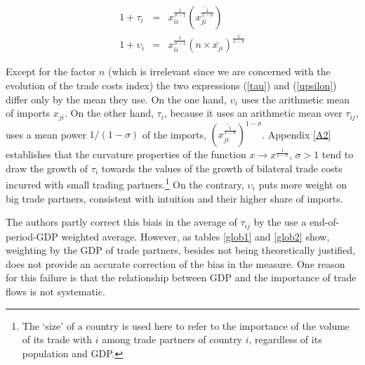 \documentclass{article}
\begin{document}
\begin{eqnarray}
1+\tau_i&=& x_{ii}^{\frac{1}{\sigma-1}} \left(\overline{{x_{ji}^{\frac{1}{1-\sigma}}}}\right) \label{tau}\\
1+\upsilon_i&=&x_{ii}^{\frac{1}{\sigma-1}} (n \times \overline{x_{ji}})^{\frac{1}{1-\sigma}}\label{upsilon}
\end{eqnarray}

Except for the factor $n$ (which is irrelevant since we are
concerned with the evolution of the trade costs index) the two
expressions (\ref{tau}) and (\ref{upsilon}) differ only by the
mean they use. On the one hand, $\upsilon_i$ uses the
arithmetic mean of imports $x_{ji}$. On the other hand,
$\tau_i$, because it uses an arithmetic mean over $\tau_{ij}$,
uses a mean power $1/(1-\sigma)$ of the imports,
$\left(\overline{x_{ji}^{\frac{1}{1-\sigma}}}\right)^{1-\sigma}$.
Appendix \ref{A2} establishes that the curvature
properties of the function $x \rightarrow
x^{\frac{1}{1-\sigma}}$, $\sigma>1$ tend to draw the growth of
$\tau_i$ towards the values of the growth of bilateral trade
costs incurred with small trading partners.\footnote{The `size' of a country is
used here to refer to the importance of the volume of its trade
with $i$ among trade partners of country $i$, regardless of its
population and GDP.} On the contrary,
$\upsilon_i$ puts more weight on big trade partners, consistent
with intuition and their higher share of imports.

The authors partly correct this biais in the average of $\tau_{ij}$ by the use a end-of-period-GDP
weighted average. However, as tables \ref{glob1} and \ref{glob2} show,
weighting by the GDP of trade partners, besides not being
theoretically justified, does not provide an accurate
correction of the bias in the measure. One reason for this
failure is that the relationship between GDP and the importance
of trade flows is not systematic.\\
\end{document}
